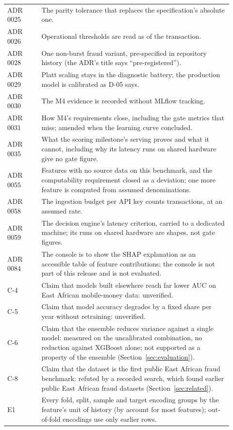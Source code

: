 \begin{longtable}{p{0.14\linewidth}p{0.78\linewidth}}
ADR 0025 & The parity tolerance that replaces the specification's absolute one. \\
ADR 0026 & Operational thresholds are read as of the transaction. \\
ADR 0028 & One non-burst fraud variant, pre-specified in repository history (the ADR's title says
``pre-registered''). \\
ADR 0029 & Platt scaling stays in the diagnostic battery; the production model is calibrated as D-05 says. \\
ADR 0030 & The M4 evidence is recorded without MLflow tracking. \\
ADR 0031 & How M4's requirements close, including the gate metrics that miss; amended when the learning curve concluded. \\
ADR 0035 & What the scoring milestone's serving proves and what it cannot, including why its latency runs on shared hardware give no gate figure. \\
ADR 0055 & Features with no source data on this benchmark, and the computability requirement closed as a deviation; one more feature is computed from assumed denominations. \\
ADR 0058 & The ingestion budget per API key counts transactions, at an assumed rate. \\
ADR 0059 & The decision engine's latency criterion, carried to a dedicated machine; its runs on shared hardware are shapes, not gate figures. \\
ADR 0084 & The console is to show the SHAP explanation as an accessible table of feature
contributions; the console is not part of this release and is not evaluated. \\
C-4 & Claim that models built elsewhere reach far lower AUC on East African mobile-money data: unverified. \\
C-5 & Claim that model accuracy degrades by a fixed share per year without retraining: unverified. \\
C-6 & Claim that the ensemble reduces variance against a single model: measured on the uncalibrated combination, no reduction against XGBoost alone; not supported as a property of the ensemble (Section~\ref{sec:evaluation}). \\
C-8 & Claim that the dataset is the first public East African fraud benchmark: refuted by a recorded
search, which found earlier public East African fraud datasets (Section~\ref{sec:related}). \\
E1 & Every fold, split, sample and target encoding groups by the feature's unit of history (by account for most features); out-of-fold encodings use only earlier rows. \\

\end{longtable}
